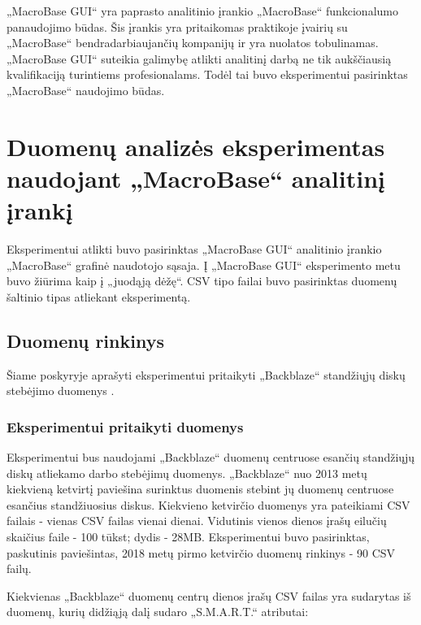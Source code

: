 \documentclass{VUMIFPSkursinis}
\begin{document}
„MacroBase GUI“ yra paprasto analitinio įrankio „MacroBase“ funkcionalumo panaudojimo būdas. Šis įrankis yra pritaikomas praktikoje įvairių su „MacroBase“ bendradarbiaujančių kompanijų ir yra nuolatos tobulinamas. „MacroBase GUI“ suteikia galimybę atlikti analitinį darbą ne tik aukščiausią kvalifikaciją turintiems profesionalams. Todėl tai buvo eksperimentui pasirinktas „MacroBase“ naudojimo būdas.

\section{Duomenų analizės eksperimentas naudojant „MacroBase“ analitinį įrankį}
Eksperimentui atlikti buvo pasirinktas „MacroBase GUI“ analitinio įrankio „MacroBase“ grafinė naudotojo sąsaja. Į „MacroBase GUI“ eksperimento metu buvo žiūrima kaip į „juodąją dėžę“.  CSV tipo failai buvo pasirinktas duomenų šaltinio tipas atliekant eksperimentą.

\subsection{Duomenų rinkinys} \label{subsec:data}
Šiame poskyryje aprašyti eksperimentui pritaikyti „Backblaze“ standžiųjų diskų stebėjimo duomenys \cite{backblaze}.

\subsubsection{Eksperimentui pritaikyti duomenys}
Eksperimentui bus naudojami „Backblaze“ duomenų centruose esančių standžiųjų diskų atliekamo darbo stebėjimų duomenys. „Backblaze“ nuo 2013 metų kiekvieną ketvirtį paviešina surinktus duomenis stebint jų duomenų centruose esančius standžiuosius diskus. Kiekvieno ketvirčio duomenys yra pateikiami CSV failais - vienas CSV failas vienai dienai. Vidutinis vienos dienos įrašų eilučių skaičius faile - 100 tūkst; dydis - 28MB. Eksperimentui buvo pasirinktas, paskutinis paviešintas, 2018 metų pirmo ketvirčio duomenų rinkinys \cite{backblaze} - 90 CSV failų.

Kiekvienas „Backblaze“ duomenų centrų dienos įrašų CSV failas yra sudarytas iš duomenų, kurių didžiąją dalį sudaro „S.M.A.R.T.“ \cite{smart_meaning} atributai:
\end{document}
